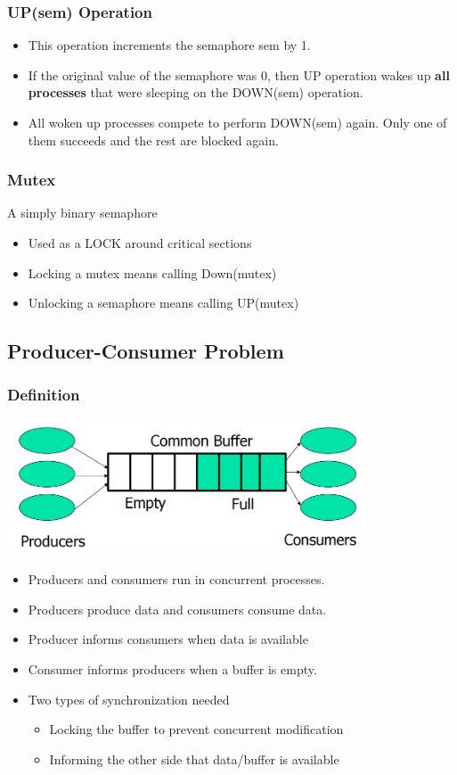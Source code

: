 \documentclass[12pt]{article}
\begin{document}
\subsubsection{UP(sem) Operation}
\begin{itemize}
    \item This operation increments the semaphore sem by 1. 
    \item If the original value of the semaphore was 0, then UP operation wakes up {\bfseries all processes} that were sleeping on the DOWN(sem) operation. 
    \item All woken up processes compete to perform DOWN(sem) again. Only one of them succeeds and the rest are blocked again.
\end{itemize}
\subsubsection{Mutex}
A simply binary semaphore
\begin{itemize}
    \item Used as a LOCK around critical sections
    \item Locking a mutex means calling Down(mutex)
    \item Unlocking a semaphore means calling UP(mutex)
\end{itemize}
\subsection{Producer-Consumer Problem}
\subsubsection{Definition}
\includegraphics[width=0.8\textwidth]{Producer-ConsumerProblem.png}
\begin{itemize}
    \item Producers and consumers run in concurrent processes.
    \item Producers produce data and consumers consume data.
    \item Producer informs consumers when data is available
    \item Consumer informs producers when a buffer is empty.
    \item Two types of synchronization needed \begin{itemize}
        \item Locking the buffer to prevent concurrent modification
        \item Informing the other side that data/buffer is available
    \end{itemize}
\end{itemize}
\end{document}
